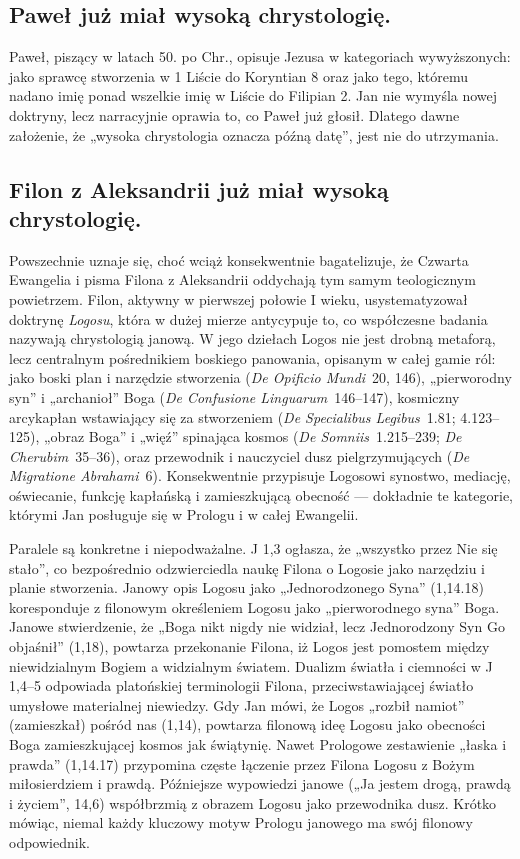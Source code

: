 \subsection{Paweł już miał wysoką chrystologię.}\label{subsec:paul-already-had-high-christology.}

Paweł, piszący w latach 50. po Chr., opisuje Jezusa w kategoriach wywyższonych: jako sprawcę stworzenia w 1 Liście do Koryntian 8 oraz jako tego, któremu nadano imię ponad wszelkie imię w Liście do Filipian 2.
Jan nie wymyśla nowej doktryny, lecz narracyjnie oprawia to, co Paweł już głosił.
Dlatego dawne założenie, że „wysoka chrystologia oznacza późną datę”, jest nie do utrzymania.

\subsection{Filon z Aleksandrii już miał wysoką chrystologię.}\label{subsec:philo-of-alexandria-already-had-high-christology.}

Powszechnie uznaje się, choć wciąż konsekwentnie bagatelizuje, że Czwarta Ewangelia i pisma Filona z Aleksandrii oddychają tym samym teologicznym powietrzem.
Filon, aktywny w pierwszej połowie I wieku, usystematyzował doktrynę \emph{Logosu}, która w dużej mierze antycypuje to, co współczesne badania nazywają chrystologią janową.
W jego dziełach Logos nie jest drobną metaforą, lecz centralnym pośrednikiem boskiego panowania, opisanym w całej gamie ról:
jako boski plan i narzędzie stworzenia (\emph{De Opificio Mundi}~20, 146),
„pierworodny syn” i „archanioł” Boga (\emph{De Confusione Linguarum}~146--147),
kosmiczny arcykapłan wstawiający się za stworzeniem (\emph{De Specialibus Legibus}~1.81; 4.123--125),
„obraz Boga” i „więź” spinająca kosmos (\emph{De Somniis}~1.215--239; \emph{De Cherubim}~35--36),
oraz przewodnik i nauczyciel dusz pielgrzymujących (\emph{De Migratione Abrahami}~6).
Konsekwentnie przypisuje Logosowi synostwo, mediację, oświecanie, funkcję kapłańską i zamieszkującą obecność --- dokładnie te kategorie, którymi Jan posługuje się w Prologu i w całej Ewangelii.

Paralele są konkretne i niepodważalne.
J 1,3 ogłasza, że „wszystko przez Nie się stało”, co bezpośrednio odzwierciedla naukę Filona o Logosie jako narzędziu i planie stworzenia.
Janowy opis Logosu jako „Jednorodzonego Syna” (1,14.18) koresponduje z filonowym określeniem Logosu jako „pierworodnego syna” Boga.
Janowe stwierdzenie, że „Boga nikt nigdy nie widział, lecz Jednorodzony Syn Go objaśnił” (1,18), powtarza przekonanie Filona, iż Logos jest pomostem między niewidzialnym Bogiem a widzialnym światem.
Dualizm światła i ciemności w J 1,4--5 odpowiada platońskiej terminologii Filona, przeciwstawiającej światło umysłowe materialnej niewiedzy.
Gdy Jan mówi, że Logos „rozbił namiot” (zamieszkał) pośród nas (1,14), powtarza filonową ideę Logosu jako obecności Boga zamieszkującej kosmos jak świątynię.
Nawet Prologowe zestawienie „łaska i prawda” (1,14.17) przypomina częste łączenie przez Filona Logosu z Bożym miłosierdziem i prawdą.
Późniejsze wypowiedzi janowe („Ja jestem drogą, prawdą i życiem”, 14,6) współbrzmią z obrazem Logosu jako przewodnika dusz.
Krótko mówiąc, niemal każdy kluczowy motyw Prologu janowego ma swój filonowy odpowiednik.

